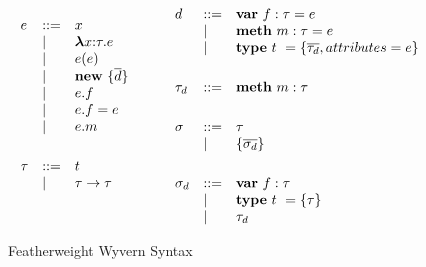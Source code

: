 \begin{figure}
\centering
\[
\begin{array}{lll}

e    & ::= & x \\
     & \mathrel{\mid} & \boldsymbol\lambda x{:}\tau . e \\
     & \mathrel{\mid} & e(e) \\
     & \mathrel{\mid} & \textbf{new}~ \{ \overline{d} \}\\
     & \mathrel{\mid} & e.f \\
     & \mathrel{\mid} & e.f = e \\
     & \mathrel{\mid} & e.m \\
\\[1ex]

\tau & ::= & t\\
     & \mathrel{\mid} & \tau \rightarrow \tau \\
\\[1ex]
	 
\end{array}
\begin{array}{lll}
~~~~
\end{array}
\begin{array}{lll}
	 
d   & ::= & \textbf{var}~ f:\tau = e \\
     & \mathrel{\mid} & \textbf{meth}~ m:\tau = e \\
     & \mathrel{\mid} & \textbf{type}~ t~ = \{ \overline{\tau_d}, attributes=e \} \\
\\[1ex]

\tau_d   & ::= & \textbf{meth}~ m:\tau \\
\\[1ex]

\sigma & ::= & \tau \\
       & \mathrel{\mid} & \{ \overline{\sigma_d} \} \\
\\[1ex]

\sigma_d & ::= & \textbf{var}~ f:\tau \\
         & \mathrel{\mid} & \textbf{type}~ t~ = \{ \tau \}  \\
         & \mathrel{\mid} & \tau_d \\

\end{array}
\]
\caption{Featherweight Wyvern Syntax}
\label{fig:core2-syntax}
\end{figure}
